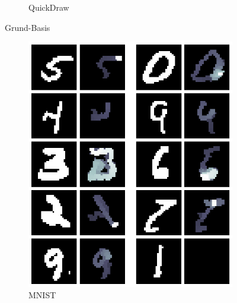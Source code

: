 \begin{figure}[!ht]
\begin{subfigure}[b]{0.3\textwidth}
        \caption{QuickDraw}
    \end{subfigure}
    \caption{Grund-Basis}
    \label{fig:Grund-Basis}
\end{figure}

\begin{figure}[!ht]
    \centering
    \begin{subfigure}[b]{0.3\textwidth}
        \centering
        \includegraphics[width=\textwidth]{images/resultate/base-mnist-mnist.png}
        \caption{MNIST}
    \end{subfigure}
    \begin{subfigure}[b]{0.3\textwidth}
        \centering

\end{subfigure}
\end{figure}
